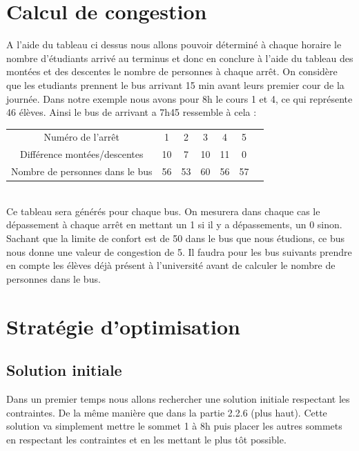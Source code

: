 \documentclass[a4paper,11pt]{article}
\begin{document}
\section{Calcul de congestion}
	A l'aide du tableau ci dessus nous allons pouvoir déterminé à chaque horaire le nombre d'étudiants arrivé au terminus et donc en conclure à l'aide du tableau des montées et des descentes le nombre de personnes à chaque arrêt. 
	On considère que les etudiants prennent le bus arrivant 15 min avant leurs premier cour de la journée.
	Dans notre exemple nous avons pour  8h le cours 1 et 4, ce qui représente 46 élèves. Ainsi le bus de arrivant a 7h45 ressemble à cela :  \\
	\begin{tabular}{ | c | c | c | c | c | c | c |}
 			\hline			
   			Numéro de l'arrêt & 1 & 2 & 3 & 4 & 5\\
   			Différence montées/descentes & 10 & 7 & 10 & 11 & 0\\
   			Nombre de personnes dans le bus & 56 & 53 & 60 & 56 & 57\\
 			\hline  
 	\end{tabular}\\
 	Ce tableau sera générés pour chaque bus. On mesurera dans chaque cas le dépassement à chaque arrêt en mettant un 1 si il y a dépassements, un 0 sinon.
 	Sachant que la limite de confort est de 50 dans le bus que nous étudions, ce bus nous donne une valeur de congestion de 5.
 	Il faudra pour les bus suivants prendre en compte les élèves déjà présent à l'université avant de calculer le nombre de personnes dans le bus.

\section{Stratégie d'optimisation}
	\subsection{Solution initiale}
		Dans un premier temps nous allons rechercher une solution initiale respectant les contraintes. De la même manière que dans la partie 2.2.6 (plus haut).
		Cette solution va simplement mettre le sommet 1 à 8h puis placer les autres sommets en respectant les contraintes et en les mettant le plus tôt possible.
\end{document}
